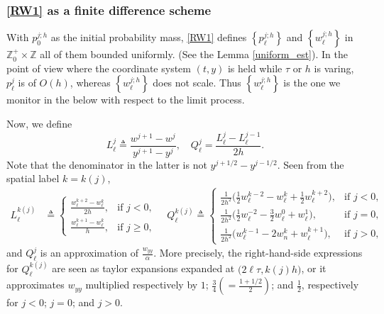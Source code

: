 \documentclass[a4paper,11pt]{article}
\def\l{{h}}
\def\Lip{{\mathrm{Lip}}}
\theoremstyle{remark}
\begin{document}
\subsubsection{\eqref{RW1} as a finite difference scheme}
With $p_{0}^{j;h}$ as the initial probability mass, \eqref{RW1} defines $\left\{p^{j;h}_{\ell}\right\}$ and $\left\{w^{j;h}_{\ell}\right\}$ in $\mathbb{Z}_0^+\times\mathbb{Z}$ all of them bounded uniformly. (See the Lemma \ref{uniform_est}). In the point of view where the coordinate system $(t,y)$ is held while $\tau$ or $h$ is varing, $p^j_\ell$ is of $O(h)$, whereas $\left\{w^{j;h}_{\ell}\right\}$ does not scale. Thus $\left\{w^{j;h}_{\ell}\right\}$ is the one we monitor in the below with respect to the limit process.

Now, we define
$$L^j_\ell \triangleq \frac{w^{j+1}-w^j}{y^{j+1}-y^j}, \quad Q^j_\ell = \frac{L^j_\ell-L^{j-1}_\ell}{2h}.$$
Note that the denominator in the latter is not $y^{j+1/2}-y^{j-1/2}$. Seen from the spatial label $k=k(j)$,
\begin{align*}
 L^{k(j)}_\ell &\triangleq \left\{\begin{array}{ll}
        \frac{w^{k+2} _{\ell} - w ^{k} _{\ell}}{2\l}, & \text{if $j<0$},\\
        \frac{w^{k+1} _{\ell} - w ^{k} _{\ell}}{\l}, & \text{if }  j\ge0,
        \end{array}\right. \quad Q^{k(j)}_\ell \triangleq \left\{\begin{array}{ll}
        \frac{1}{2\l^2}\Big( \frac{1}{2} w^{k-2} _{\ell} - w ^{k} _{\ell} + \frac{1}{2} w^{k+2} _{\ell}\Big), & \text{if $j<0$},\\
        \frac{1}{2\l^2}\Big( \frac{1}{2} w^{-2} _{\ell} - \frac{3}{2}w ^{0} _{\ell} +w^{1} _{\ell}\Big), & \text{if $j=0$},\\
        \frac{1}{2\l^2}\Big(w^{k-1} _{\ell} - 2w^k_n + w ^{k+1} _{\ell}\Big), & \text{if $j>0$},
        \end{array}\right.
\end{align*}
and $Q^j_\ell$ is an approximation of $\frac{w_{yy}}{\alpha}$. More precisely, the right-hand-side expressions for $Q^{k(j)}_\ell$ are seen as taylor expansions expanded at $\big(2\ell\tau,k(j)\l\big)$, or it approximates $w_{yy}$ multiplied respectively by $1$; $\frac{3}{4}\left(=\tfrac{1+1/2}{2}\right)$; and $\frac{1}{2}$, respectively for $j<0$; $j=0$; and $j>0$.
\end{document}
